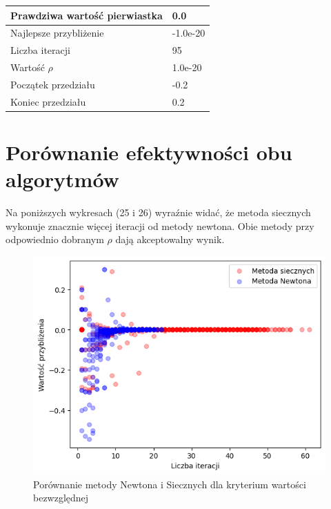 \documentclass{article}
\begin{document}
\begin{table}[H]
    \centering
    \begin{tabular}{|l|l|}
    \hline
        Prawdziwa wartość pierwiastka & 0.0 \\ \hline
        Najlepsze przybliżenie & -1.0e-20 \\ \hline
        Liczba iteracji & 95 \\ \hline
        Wartość $\rho$ & 1.0e-20 \\ \hline
        Początek przedziału & -0.2 \\ \hline
        Koniec przedziału & 0.2 \\ \hline
    \end{tabular}
\end{table}

\section{Porównanie efektywności obu algorytmów}

Na poniższych wykresach (25 i 26) wyraźnie widać, że metoda siecznych wykonuje znacznie więcej iteracji od metody newtona. Obie metody przy odpowiednio dobranym \(\rho\) dają akceptowalny wynik.

\begin{figure}[H]
  \centering
  \begin{minipage}[b]{\textwidth}
    \includegraphics[width=\textwidth]{img25.png}
  \end{minipage}
  \caption{Porównanie metody Newtona i Siecznych dla kryterium wartości bezwzględnej}
\end{figure}
\end{document}
